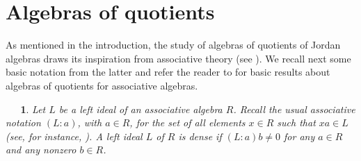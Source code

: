 \documentclass[a4paper,twoside,11pt]{article}
\theoremstyle{plain}
\theoremstyle{miestilo}
\theoremstyle{misnotas}
\newtheorem{apartado}[subsection]{\ {\ }}
\begin{document}


 \section{Algebras of quotients}

As mentioned in the introduction, the study of algebras of quotients of Jordan algebras draws its inspiration from  associative theory  (see \cite{densos}). We recall next some basic notation from the latter and refer the reader to \cite{anillos,st} for basic results about algebras of
 quotients for associative algebras.

\begin{apartado}Let $L$ be a left ideal of an associative algebra $R$. Recall the usual associative
notation  $(L:a)$, with $a\in R$, for the
 set of all elements $x\in R$ such that $xa\in L$ (see, for instance, \cite{st}). A left ideal $L$
 of $R$ is \emph{dense} if $(L:a)b\neq0$
 for any $a\in R$ and any nonzero $b \in R$.
\end{apartado}
\end{document}
